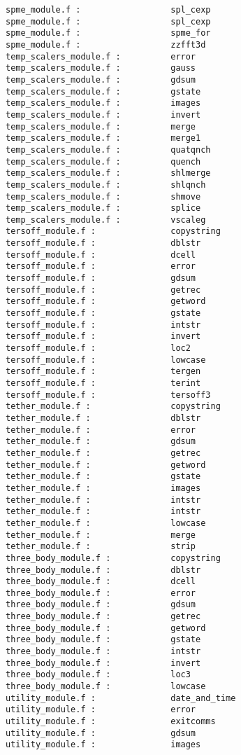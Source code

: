 \begin{verbatim}
spme_module.f :                  spl_cexp 
spme_module.f :                  spl_cexp 
spme_module.f :                  spme_for 
spme_module.f :                  zzfft3d 
temp_scalers_module.f :          error 
temp_scalers_module.f :          gauss 
temp_scalers_module.f :          gdsum 
temp_scalers_module.f :          gstate 
temp_scalers_module.f :          images 
temp_scalers_module.f :          invert 
temp_scalers_module.f :          merge 
temp_scalers_module.f :          merge1 
temp_scalers_module.f :          quatqnch 
temp_scalers_module.f :          quench 
temp_scalers_module.f :          shlmerge 
temp_scalers_module.f :          shlqnch 
temp_scalers_module.f :          shmove 
temp_scalers_module.f :          splice 
temp_scalers_module.f :          vscaleg 
tersoff_module.f :               copystring 
tersoff_module.f :               dblstr
tersoff_module.f :               dcell 
tersoff_module.f :               error 
tersoff_module.f :               gdsum 
tersoff_module.f :               getrec 
tersoff_module.f :               getword 
tersoff_module.f :               gstate 
tersoff_module.f :               intstr
tersoff_module.f :               invert 
tersoff_module.f :               loc2
tersoff_module.f :               lowcase 
tersoff_module.f :               tergen 
tersoff_module.f :               terint 
tersoff_module.f :               tersoff3 
tether_module.f :                copystring 
tether_module.f :                dblstr
tether_module.f :                error 
tether_module.f :                gdsum 
tether_module.f :                getrec 
tether_module.f :                getword 
tether_module.f :                gstate 
tether_module.f :                images 
tether_module.f :                intstr
tether_module.f :                intstr
tether_module.f :                lowcase 
tether_module.f :                merge 
tether_module.f :                strip 
three_body_module.f :            copystring 
three_body_module.f :            dblstr
three_body_module.f :            dcell 
three_body_module.f :            error 
three_body_module.f :            gdsum 
three_body_module.f :            getrec 
three_body_module.f :            getword 
three_body_module.f :            gstate 
three_body_module.f :            intstr
three_body_module.f :            invert 
three_body_module.f :            loc3
three_body_module.f :            lowcase 
utility_module.f :               date_and_time 
utility_module.f :               error 
utility_module.f :               exitcomms 
utility_module.f :               gdsum 
utility_module.f :               images 

\end{verbatim}
